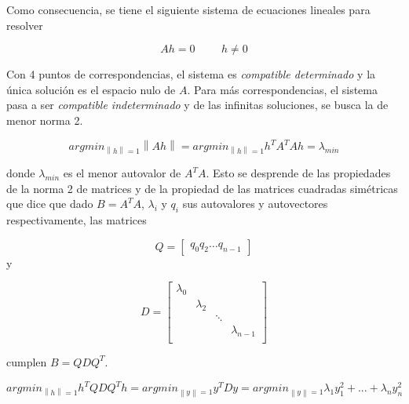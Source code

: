 \documentclass[a4paper,10pt]{article}
\newcommand{\norm}[1]{\left\lVert#1\right\rVert}
\begin{document}
Como consecuencia, se tiene el siguiente sistema de ecuaciones lineales para resolver

\begin{equation}
    Ah = 0 \hspace{1cm} h \neq 0
\end{equation}

Con 4 puntos de correspondencias, el sistema es \textit{compatible determinado} y la única solución es el espacio nulo de $A$. Para más correspondencias,
el sistema pasa a ser \textit{compatible indeterminado} y de las infinitas soluciones, se busca la de menor norma 2.

\begin{equation}
    argmin_{\norm{h}=1} \norm{Ah} = argmin_{\norm{h}=1} h^{T}A^{T}Ah = \lambda_{min}
\end{equation}

donde $\lambda_{min}$ es el menor autovalor de $A^{T}A$. Esto se desprende de las propiedades de la norma 2 de matrices y de la propiedad de
las matrices cuadradas simétricas que dice que dado $B = A^{T}A$, $\lambda_{i}$ y $q_{i}$ sus autovalores y autovectores respectivamente, las matrices

\begin{equation}
    Q = \begin{bmatrix}
            q_{0} q_{2} \dots q_{n-1}
        \end{bmatrix}
\end{equation}
y

\begin{equation}
    D = \begin{bmatrix}
            \lambda_{0} & & & \\
                        & \lambda_{2} & & \\
                        & & \ddots & \\
                        & & & \lambda_{n-1}\\
        \end{bmatrix}
\end{equation}

cumplen $B = QDQ^{T}$.

\begin{equation}
    argmin_{\norm{h}=1} h^{T}QDQ^{T}h = argmin_{\norm{y}=1} y^{T}Dy = argmin_{\norm{y}=1} \lambda_{1}y^{2}_{1} + ... + \lambda_{n}y^{2}_{n}
\end{equation}
\end{document}
